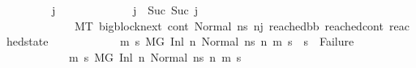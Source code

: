 \begin{isabellebody}
\ \ \ \ \ \ \ {\isachardoublequoteopen}{\isasymAnd}\ j{\isacharprime}{\kern0pt}{\isacharprime}{\kern0pt}{\isachardot}{\kern0pt}\ \isanewline
\ \ \ \ \ \ \ \ \ \ \ \ j{\isacharprime}{\kern0pt}\ {\isacharequal}{\kern0pt}\ Suc\ {\isacharparenleft}{\kern0pt}Suc\ j{\isacharprime}{\kern0pt}{\isacharprime}{\kern0pt}{\isacharparenright}{\kern0pt}\ {\isasymLongrightarrow}\isanewline
\ \ \ \ \ \ \ \ \ \ \ \ M{\isacharcomma}{\kern0pt}{\isasymLambda}{\isacharcomma}{\kern0pt}{\isasymGamma}{\isacharcomma}{\kern0pt}{\isasymOmega}{\isacharcomma}{\kern0pt}T\ {\isasymturnstile}{\isacharparenleft}{\kern0pt}bigblock{\isacharunderscore}{\kern0pt}next{\isacharcomma}{\kern0pt}\ cont{}{\isacharcomma}{\kern0pt}\ Normal\ ns{}{\isacharprime}{\kern0pt}{\isacharprime}{\kern0pt}{\isacharparenright}{\kern0pt}\ {\isacharminus}{\kern0pt}n{\isasymlongrightarrow}{\isacharcircum}{\kern0pt}j{\isacharprime}{\kern0pt}{\isacharprime}{\kern0pt}\ {\isacharparenleft}{\kern0pt}reached{\isacharunderscore}{\kern0pt}bb{\isacharcomma}{\kern0pt}\ reached{\isacharunderscore}{\kern0pt}cont{\isacharcomma}{\kern0pt}\ reached{\isacharunderscore}{\kern0pt}state{\isacharparenright}{\kern0pt}\ {\isasymLongrightarrow}\isanewline
\ \ \ \ \ \ \ \ \ \ \ {\isacharparenleft}{\kern0pt}{\isasymAnd}m{\isacharprime}{\kern0pt}\ s{\isacharprime}{\kern0pt}{\isachardot}{\kern0pt}\ M{\isacharcomma}{\kern0pt}{\isasymLambda}{\isacharcomma}{\kern0pt}{\isasymGamma}{\isacharcomma}{\kern0pt}{\isasymOmega}{\isacharcomma}{\kern0pt}G\ {\isasymturnstile}{\isacharparenleft}{\kern0pt}Inl\ n{\isacharcomma}{\kern0pt}\ Normal\ ns{}{\isacharprime}{\kern0pt}{\isacharprime}{\kern0pt}{\isacharparenright}{\kern0pt}\ {\isacharminus}{\kern0pt}n{\isasymrightarrow}{\isacharasterisk}{\kern0pt}\ {\isacharparenleft}{\kern0pt}m{\isacharprime}{\kern0pt}{\isacharcomma}{\kern0pt}\ s{\isacharprime}{\kern0pt}{\isacharparenright}{\kern0pt}\ {\isasymLongrightarrow}\ s{\isacharprime}{\kern0pt}\ {\isasymnoteq}\ Failure{\isacharparenright}{\kern0pt}\ {\isasymLongrightarrow}\isanewline
\ \ \ \ \ \ \ \ \ \ \ {\isacharparenleft}{\kern0pt}{\isasymAnd}m{\isacharprime}{\kern0pt}\ s{\isacharprime}{\kern0pt}{\isachardot}{\kern0pt}\ {\isacharparenleft}{\kern0pt}M{\isacharcomma}{\kern0pt}{\isasymLambda}{\isacharcomma}{\kern0pt}{\isasymGamma}{\isacharcomma}{\kern0pt}{\isasymOmega}{\isacharcomma}{\kern0pt}G\ {\isasymturnstile}{\isacharparenleft}{\kern0pt}Inl\ n{\isacharcomma}{\kern0pt}\ Normal\ ns{}{\isacharprime}{\kern0pt}{\isacharprime}{\kern0pt}{\isacharparenright}{\kern0pt}\ {\isacharminus}{\kern0pt}n{\isasymrightarrow}{\isacharasterisk}{\kern0pt}\ {\isacharparenleft}{\kern0pt}m{\isacharprime}{\kern0pt}{\isacharcomma}{\kern0pt}\ s{\isacharprime}{\kern0pt}{\isacharparenright}{\kern0pt}{\isacharparenright}{\kern0pt}\ {\isasymLongrightarrow}\isanewline

\end{isabellebody}
